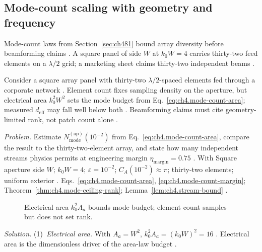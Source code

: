 \subsection{Mode-count scaling with geometry and frequency}
\label{sec:ch4104}
Mode-count laws from Section~\ref{sec:ch481} bound array diversity before beamforming claims \cite{collin2001}. A square panel of side $W$ at $k_{0}W=4$ carries thirty-two feed elements on a $\lambda/2$ grid; a marketing sheet claims thirty-two independent beams \cite{harrington2001}.
\begin{physicalvignette}
Consider a square array panel with thirty-two $\lambda/2$-spaced elements fed through a corporate network \cite{collin2001}. Element count fixes sampling density on the aperture, but electrical area $k_{0}^{2}W^{2}$ sets the mode budget from Eq.~\eqref{eq:ch4.mode-count-area}; measured $d_{\mathrm{eff}}$ may fall well below both \cite{hansen1988}. Beamforming claims must cite geometry-limited rank, not patch count alone \cite{stratton1941}.
\end{physicalvignette}
\emph{Problem.} Estimate $N_{\mathrm{mode}}^{\mathrm{(ap)}}(10^{-2})$ from Eq.~\eqref{eq:ch4.mode-count-area}, compare the result to the thirty-two-element array, and state how many independent streams physics permits at engineering margin $\eta_{\mathrm{margin}}=0.75$ .
With Square aperture side $W$; $k_{0}W=4$; $\varepsilon=10^{-2}$; $C_{A}(10^{-2})\approx\pi$; thirty-two elements; uniform exterior . Eqs.~\eqref{eq:ch4.mode-count-area}, \eqref{eq:ch4.mode-count-margin}; Theorem~\ref{thm:ch4.mode-ceiling-rank}; Lemma~\ref{lem:ch4.stream-bound} .
\begin{figure}[t]
\centering
{}
\caption{Electrical area $k_{0}^{2}A_{a}$ bounds mode budget; element count samples but does not set rank.}
\label{fig:ch4.ex-mode-count-scaling}
\end{figure}
\emph{Solution.} (1)~\emph{Electrical area.} With $A_{a}=W^{2}$, $k_{0}^{2}A_{a}=(k_{0}W)^{2}=16$ . Electrical area is the dimensionless driver of the area-law budget .
